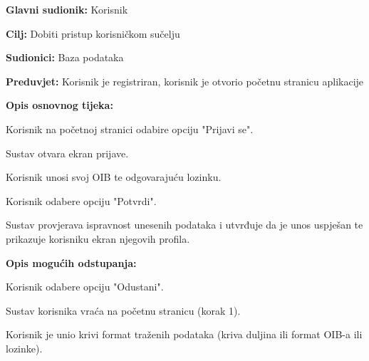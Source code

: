 					\noindent {}
					\begin{packed_item}
						
						\item \textbf{Glavni sudionik: }Korisnik
						\item  \textbf{Cilj:} Dobiti pristup korisničkom sučelju
						\item  \textbf{Sudionici:} Baza podataka
						\item  \textbf{Preduvjet:} Korisnik je registriran, korisnik je otvorio početnu stranicu aplikacije
						\item  \textbf{Opis osnovnog tijeka:}
						
						\item[] \begin{packed_enum}
							
							\item Korisnik na početnoj stranici odabire opciju "Prijavi se".
							\item Sustav otvara ekran prijave.
							\item Korisnik unosi svoj OIB te odgovarajuću lozinku.
							\item Korisnik odabere opciju "Potvrdi".
							\item Sustav provjerava ispravnost unesenih podataka i utvrđuje da je unos uspješan te prikazuje korisniku ekran njegovih profila.
						\end{packed_enum}
						
						\item  \textbf{Opis mogućih odstupanja:}
						
						\item[] \begin{packed_item}
							
							\item[4.a] Korisnik odabere opciju "Odustani".
							\item[] \begin{packed_enum}
								
								\item Sustav korisnika vraća na početnu stranicu (korak 1).
		
								
							\end{packed_enum}
							
								\item[5.a] Korisnik je unio krivi format traženih podataka (kriva duljina ili format OIB-a ili lozinke).
							\item[] \begin{packed_enum}
								

\end{packed_enum}
\end{packed_item}
\end{packed_item}
